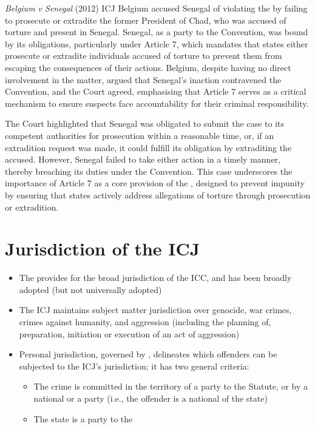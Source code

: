 \begin{casedetails}{\textit{Belgium v Senegal} (2012) ICJ}
    \flushleft
    Belgium accused Senegal of violating the  by failing to prosecute or extradite the former President of Chad, who was accused of torture and present in Senegal. Senegal, as a party to the Convention, was bound by its obligations, particularly under Article 7, which mandates that states either prosecute or extradite individuals accused of torture to prevent them from escaping the consequences of their actions. Belgium, despite having no direct involvement in the matter, argued that Senegal's inaction contravened the Convention, and the Court agreed, emphasising that Article 7 serves as a critical mechanism to ensure suspects face accountability for their criminal responsibility.

    \vspace{\baselineskip}

    The Court highlighted that Senegal was obligated to submit the case to its competent authorities for prosecution within a reasonable time, or, if an extradition request was made, it could fulfill its obligation by extraditing the accused. However, Senegal failed to take either action in a timely manner, thereby breaching its duties under the Convention. This case underscores the importance of Article 7 as a core provision of the , designed to prevent impunity by ensuring that states actively address allegations of torture through prosecution or extradition.
\end{casedetails}

\section{Jurisdiction of the ICJ}
\begin{itemize}
    \item The  provides for the broad jurisdiction of the ICC, and has been broadly adopted (but not universally adopted)
    \item The ICJ maintains subject matter jurisdiction over genocide, war crimes, crimes against humanity, and aggression (including the planning of, preparation, initiation or execution of an act of aggression)
    \item Personal jurisdiction, governed by , delineates which offenders can be subjected to the ICJ's jurisdiction; it has two general criteria:
    \begin{itemize}
        \item The crime is committed in the territory of a party to the Statute, or by a national or a party (i.e., the offender is a national of the state)
        \item The state is a party to the 
    \end{itemize}
\end{itemize}

